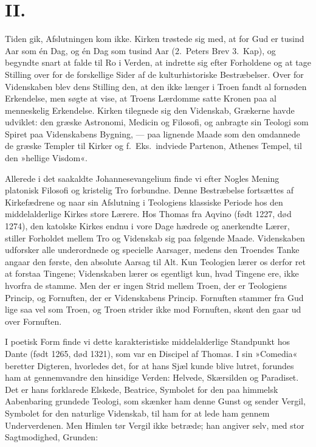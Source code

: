 \documentclass[12pt,a4paper]{article}
\newcommand{\apage}[1]{\marginnote{\footnotesize\textit{[#1]}}}
\begin{document}
\section*{II.}

Tiden gik, Afslutningen kom ikke. Kirken trøstede sig med, at for Gud er
tusind Aar som én Dag, og én Dag som tusind Aar (2.\ Peters Brev 3.\ Kap),
og begyndte snart at falde til Ro i Verden, at indrette sig efter
Forholdene og at tage Stilling over for de forskellige Sider af de
kulturhistoriske Bestræbelser. Over for Videnskaben blev dens Stilling den,
at den ikke længer i Troen fandt al fornøden Erkendelse, men søgte at vise,
at Troens Lærdomme satte Kronen paa al \apage{197} menneskelig Erkendelse. Kirken
tilegnede sig den Videnskab, Grækerne havde udviklet: den græske Astronomi,
Medicin og Filosofi, og anbragte sin Teologi som Spiret paa Videnskabens
Bygning, --- paa lignende Maade som den omdannede de græske Templer til
Kirker og f.\ Eks.\ indviede Partenon, Athenes Tempel, til den »hellige
Visdom«.

Allerede i det saakaldte Johannesevangelium finde vi efter Nogles Mening
platonisk Filosofi og kristelig Tro forbundne. Denne Bestræbelse fortsættes
af Kirkefædrene og naar sin Afslutning i Teologiens klassiske Periode hos
den middelalderlige Kirkes store Lærere. Hos Thomas fra Aqvino (født 1227,
død 1274), den katolske Kirkes endnu i vore Dage hædrede og anerkendte
Lærer, stiller Forholdet mellem Tro og Videnskab sig paa følgende Maade.
Videnskaben udforsker alle underordnede og specielle Aarsager, medens den
Troendes Tanke angaar den første, den absolute Aarsag til Alt. Kun
Teologien lærer os derfor ret at forstaa Tingene; Videnskaben lærer os
egentligt kun, hvad Tingene ere, ikke hvorfra de stamme. Men der er ingen
Strid mellem Troen, der er Teologiens Princip, og Fornuften, der er
Videnskabens Princip. Fornuften stammer fra Gud lige saa vel som Troen, og
Troen strider ikke mod Fornuften, skønt den gaar ud over Fornuften.

I poetisk Form finde vi dette karakteristiske middelalderlige Standpunkt
hos Dante (født 1265, død 1321), som var en Discipel af Thomas. I sin
»Comedia« beretter Digteren, hvorledes det, for at hans Sjæl kunde blive
lutret, forundes ham at gennemvandre den hinsidige Verden: Helvede,
Skærsilden og Paradiset. Det er hans forklarede Elskede, Beatrice, Symbolet
for den paa himmelsk Aabenbaring grundede Teologi, som skænker ham denne
Gunst og sender Vergil, Symbolet for den naturlige Videnskab, til ham for
at lede ham gennem Underverdenen. Men Himlen tør Vergil ikke betræde; han
angiver selv, med stor Sagtmodighed, Grunden:
\end{document}
